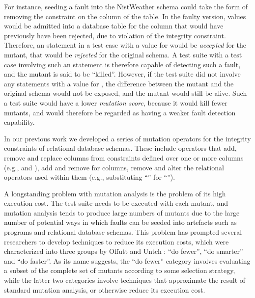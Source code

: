 For instance, seeding a fault into the NistWeather schema could take the form of removing the \NOTNULL constraint on the  column of the  table. In the faulty version, \NULL values would be admitted into a database table for the  column that would have previously have been rejected, due to violation of the integrity constraint. Therefore, an \INSERT statement in a test case with a \NULL value for  would be {\it accepted} for the mutant, that would be {\it rejected} for the original schema. A test suite with a test case involving such an \INSERT statement is therefore capable of detecting such a fault, and the mutant is said to be ``killed''. However, if the test suite did not involve any \INSERT statements with a \NULL value for , the difference between the mutant and the original schema would not be exposed, and the mutant would still be alive. Such a test suite would have a lower {\it mutation score}, because it would kill fewer mutants, and would therefore be regarded as having a weaker fault detection capability. 

In our previous work \cite{Kapfhammer2013,Wright2013,Wright2014} we developed a series of mutation operators for the integrity constraints of relational database schemas. These include operators that add, remove and replace columns from constraints defined over one or more columns (e.g., \PK and \FKCs), add and remove \NNCs for columns, remove \CCs and alter the relational operators used within them (e.g., substituting ``\sql{>}'' for ``\sql{>=}''). 

A longstanding problem with mutation analysis is the problem of its high execution cost. The test suite needs to be executed with each mutant, and mutation analysis tends to produce large numbers of mutants due to the large number of potential ways in which faults can be seeded into artefacts such as programs and relational database schemas. This 
problem
has prompted several researchers to develop techniques to reduce its execution costs, which were characterized into three groups by Offutt and Untch \cite{Offutt2001}: ``do fewer'', ``do smarter'' and ``do faster''. As its name suggests, the ``do fewer'' category involves evaluating a subset of the complete set of mutants according to some selection strategy, while the latter two categories involve techniques that approximate the result of standard mutation analysis, or otherwise reduce its execution cost.  

